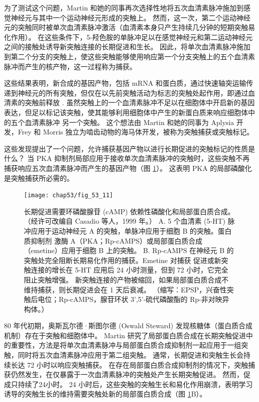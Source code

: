 为了测试这个问题，Martin 和她的同事再次选择性地将五次血清素脉冲施加到感觉神经元与其中一个运动神经元形成的突触上。 然而，这一次，第二个运动神经元的突触同时被单次血清素脉冲激活（血清素本身只产生持续几分钟的短期突触易化作用）。 在这些条件下，5-羟色胺的单脉冲足以在感觉神经元和第二运动神经元之间的接触处诱导新突触连接的长期促进和生长。 因此，将单次血清素脉冲施加到第二个分支的突触上，使这些突触能够使用响应第一个分支突触上的五个血清素脉冲而产生的核产物，这一过程称为捕获。

这些结果表明，新合成的基因产物，包括 mRNA 和蛋白质，通过快速轴突运输传递到神经元的所有突触，但仅在以先前突触活动为标志的突触处起作用，即通过血清素的突触前释放 . 虽然突触上的一个血清素脉冲不足以在细胞体中开启新的基因表达，但足以标记该突触，使其能够利用细胞体中产生的新蛋白质来响应细胞体中的五个血清素脉冲 另一个突触。 这个想法由 Martin 和她的同事为 Aplysia 开发，Frey 和 Morris 独立为啮齿动物的海马体开发，被称为突触捕获或突触标记。

这些发现提出了一个问题，允许捕获基因产物以进行长期促进的突触标记的性质是什么？ 当 PKA 抑制剂局部应用于接收单次血清素脉冲的突触时，这些突触不再捕获响应五次血清素脉冲而产生的基因产物（图 \ref{fig:53_11}）。 这表明 PKA 的局部磷酸化是突触捕获所必需的。

\begin{figure}[htbp]
	\centering
	\texttt{[image: chap53/fig\_53\_11]}
	\caption{长期促进需要环磷酸腺苷 (cAMP) 依赖性磷酸化和局部蛋白质合成。 （经许可改编自 Casadio 等人，1999 年。） A. 5 个血清素 (5-HT) 脉冲应用于运动神经元 A 的突触，单脉冲应用于细胞 B 的突触。蛋白质抑制剂 激酶 A（PKA；Rp-cAMPS）或局部蛋白质合成（emetine）应用于细胞 B 上的突触。 B. Rp-cAMPS 在神经元 B 的突触处完全阻断长期易化作用的捕获。Emetine 对捕获 促进或新突触连接的增长在 5-HT 应用后 24 小时测量，但到 72 小时，它完全阻止突触增强。 新突触连接的产物被缩回，如果局部蛋白质合成不维持捕获，则长期促进会在 1 天后衰减。 （缩写：EPSP，兴奋性突触后电位；Rp-cAMPS，腺苷环状 3',5'-硫代磷酸酯的 Rp-非对映异构体。）}
	\label{fig:53_11}
\end{figure}

80 年代初期，奥斯瓦尔德·斯图尔德 (Oswald Steward) 发现核糖体（蛋白质合成机制）存在于突触和细胞体中。 Martin 研究了局部蛋白质合成在长期突触促进中的重要性，方法是将单次血清素脉冲与局部蛋白质合成抑制剂一起应用于一组突触，同时将五次血清素脉冲应用于第二组突触。 通常，长期促进和突触生长会持续长达 72 小时以响应突触捕获。 在存在局部蛋白质合成抑制剂的情况下，突触捕获仍然发生，在仅暴露于一次血清素脉冲的突触处产生长期突触促进。 然而，促成只持续了24小时。 24 小时后，这些突触的突触生长和易化作用崩溃，表明学习诱导的突触生长的维持需要突触处新的局部蛋白质合成（图 \ref{fig:53_11}B）。

